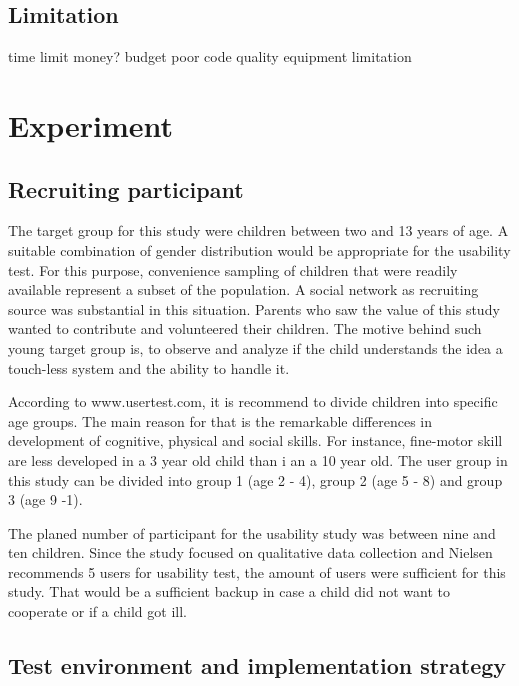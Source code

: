 \subsection{Limitation}
time limit
money? budget
poor code quality
equipment limitation

\section{Experiment }
\label{sec:experiment}


\subsection{Recruiting participant}
\label{sec:participant}

The target group for this study were children between two and 13 years of age. A suitable combination of gender distribution would be appropriate for the usability test. For this purpose, convenience sampling of children that were readily available represent a subset of the population. A social network as recruiting source was substantial in this situation. Parents who saw the value of this study wanted to contribute and volunteered their children. 
The motive behind such young target group is, to observe and analyze if the child understands the idea a touch-less system and the ability to handle it. 

According to www.usertest.com, it is recommend to divide children into specific age groups. The main reason for that is the remarkable differences in development of cognitive, physical and social skills. For instance, fine-motor skill are less developed in a 3 year old child than i an a 10 year old. The user group in this study can be divided into group 1 (age 2 - 4), group 2 (age 5 - 8) and group 3 (age 9 -1).

The planed number of participant for the usability study was between nine and ten children. Since the study focused on qualitative data collection and Nielsen recommends 5 users for usability test, the amount of users were sufficient for this study. That would be a sufficient backup in case a child did not want to cooperate or if a child got ill. 


\subsection{Test environment and implementation strategy}
\label{sec:environmnent}

